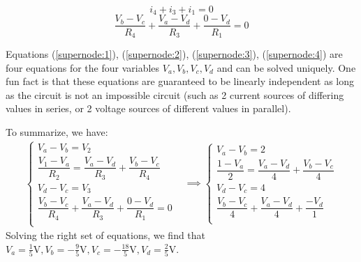 \begin{enumerate}
{	$$i_4 + i_3 + i_1 = 0$$
	\begin{equation} \label{supernode:4} \dfrac{V_b - V_c}{R_4} + \dfrac{V_a-V_d}{R_3} + \dfrac{0-V_d}{R_1} = 0 \end{equation}

	Equations (\ref{supernode:1}), (\ref{supernode:2}), (\ref{supernode:3}), (\ref{supernode:4}) are four equations for the four variables $V_a, V_b, V_c, V_d$ and can be solved uniquely. One fun fact is that these equations are guaranteed to be linearly independent as long as the circuit is not an impossible circuit (such as 2 current sources of differing values in series, or 2 voltage sources of different values in parallel).
	
	To summarize, we have:
	\begin{align*}
	    \begin{cases*}
	    V_a - V_b = V_2\\
	    \dfrac{V_1 - V_a}{R_2} = \dfrac{V_a - V_d}{R_3} + \dfrac{V_b - V_c}{R_4}\\
	    V_d - V_c = V_3\\
	    \dfrac{V_b - V_c}{R_4} + \dfrac{V_a-V_d}{R_3} + \dfrac{0-V_d}{R_1} = 0 \\
	    \end{cases*}
	    &\implies
	    \begin{cases*}
	    V_a - V_b = 2\\
	    \dfrac{1-V_a}{2} = \dfrac{V_a - V_d}{4} + \dfrac{V_b - V_c}{4}\\
	    V_d - V_c = 4\\
	    \dfrac{V_b - V_c}{4} + \dfrac{V_a - V_d}{4} + \dfrac{-V_d}{1}\\
	    \end{cases*}
	\end{align*}
	Solving the right set of equations, we find that $\boxed{V_a = \frac{1}{5}\text{V}, V_b = -\frac{9}{5}\text{V}, V_c=-\frac{18}{5}\text{V}, V_d=\frac{2}{5}\text{V}}$.
}


\end{enumerate}
